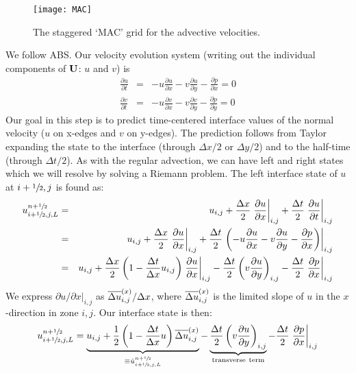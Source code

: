 \begin{figure}[h]
\centering
\texttt{[image: MAC]}
\caption[MAC grid for velocity]
  {\label{fig:MAC} The staggered `MAC' grid for the advective
  velocities.}
\end{figure}


We follow ABS.  Our velocity evolution system (writing out the
individual components of ${\bf U}$: $u$ and $v$) is
\begin{eqnarray}
\frac{\partial u}{\partial t} &=& -u \frac{\partial u}{\partial x} 
                                  -v \frac{\partial u}{\partial y} 
                                  -\frac{\partial p}{\partial x} = 0 \\
\frac{\partial v}{\partial t} &=& -u \frac{\partial v}{\partial x} 
                                  -v \frac{\partial v}{\partial y} 
                                  -\frac{\partial p}{\partial y} = 0 
\end{eqnarray}
Our goal in this step is to predict time-centered interface values of
the normal velocity ($u$ on x-edges and $v$ on y-edges).  The
prediction follows from Taylor expanding the state to the interface
(through $\Delta x/2$ or $\Delta y/2$) and to the half-time (through
$\Delta t/2$).  As with the regular advection, we can have left and
right states which we will resolve by solving a Riemann problem.  The
left interface state of $u$ at $i+{\sfrac{1}{2}},j$ is found as:
\begin{eqnarray}
u_{i+{\sfrac{1}{2}},j,L}^{n+{\sfrac{1}{2}}} 
  &=& u_{i,j} 
    + \frac{\Delta x}{2} \left . \frac{\partial u}{\partial x} \right |_{i,j}
    + \frac{\Delta t}{2} \left . \frac{\partial u}{\partial t} \right |_{i,j}\\
  &=& u_{i,j} 
    + \frac{\Delta x}{2} \left . \frac{\partial u}{\partial x} \right |_{i,j}
    + \frac{\Delta t}{2} \left . \left (-u \frac{\partial u}{\partial x}
                                -v \frac{\partial u}{\partial y}
                                -\frac{\partial p}{\partial x} \right ) \right |_{i,j}\\
  &=& u_{i,j} 
    + \frac{\Delta x}{2} \left ( 1 - \frac{\Delta t}{\Delta x} u_{i,j} \right )
                         \left .  \frac{\partial u}{\partial x}\right |_{i,j}
    - \frac{\Delta t}{2} \left ( v \frac{\partial u}{\partial y}\right )_{i,j}
    - \frac{\Delta t}{2} \left . \frac{\partial p}{\partial x} \right |_{i,j}\\
\end{eqnarray}
We express ${\partial u}/{\partial x} |_{i,j}$ as $\overline{\Delta u}^{(x)}_{i,j} / \Delta
x$, where $\overline{\Delta u}^{(x)}_{i,j}$ is the limited slope of $u$ in the
$x$-direction in zone $i,j$.  Our interface state is then:
\begin{equation}
u_{i+{\sfrac{1}{2}},j,L}^{n+{\sfrac{1}{2}}} 
    = \underbrace{u_{i,j} + \frac{1}{2} \left ( 1 - \frac{\Delta t}{\Delta x} u \right ) \overline{\Delta u}^{(x)}_{i,j}}_{\equiv \hat{u}_{i+{\sfrac{1}{2}},j,L}^{n+{\sfrac{1}{2}}}}
    - \underbrace{\frac{\Delta t}{2} \left ( v \frac{\partial u}{\partial y} \right )_{i,j}}_{\mathrm{transverse~term}}
    - \frac{\Delta t}{2} \left . \frac{\partial p}{\partial x} \right |_{i,j}
\label{eq:uMAC_l}
\end{equation} 



